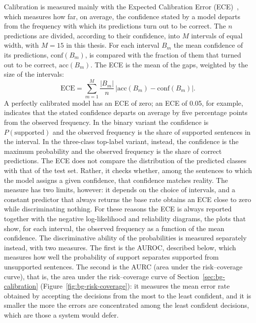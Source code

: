 Calibration is measured mainly with the Expected Calibration Error
(ECE)~\cite{naeini2015ece,guo2017calibration}, which measures how far, on average, the confidence stated by a model
departs from the frequency with which its predictions turn out to be correct. The $n$ predictions are divided, according
to their confidence, into $M$ intervals of equal width, with $M = 15$ in this thesis. For each interval $B_m$ the mean
confidence of its predictions, $\mathrm{conf}(B_m)$, is compared with the fraction of them that turned out to be
correct, $\mathrm{acc}(B_m)$. The ECE is the mean of the gaps, weighted by the size of the intervals:
\begin{equation}
  \mathrm{ECE} = \sum_{m=1}^{M} \frac{|B_m|}{n} \, \bigl| \mathrm{acc}(B_m) - \mathrm{conf}(B_m) \bigr| .
  \label{eq:ece}
\end{equation}
A perfectly calibrated model has an ECE of zero; an ECE of 0.05, for example, indicates that the stated confidence
departs on average by five percentage points from the observed frequency. In the binary variant the confidence is $P(\text{supported})$ and the
observed frequency is the share of supported sentences in the interval. In the three-class top-label variant, instead,
the confidence is the maximum probability and the observed frequency is the share of correct predictions. The ECE does
not compare the distribution of the predicted classes with that of the test set. Rather, it checks whether, among the
sentences to which the model assigns a given confidence, that confidence matches reality. The measure has two limits,
however: it depends on the choice of intervals, and a constant predictor that always returns the base rate obtains an
ECE close to zero while discriminating nothing. For these reasons the ECE is always reported together with the
negative log-likelihood and reliability diagrams, the plots that show, for each interval, the observed frequency as a
function of the mean confidence. The discriminative ability of the probabilities is measured separately instead, with
two measures. The first is the AUROC, described below, which measures how well the probability of support separates
supported from unsupported sentences. The second is the AURC (area under the
risk--coverage curve), that is, the area under the risk--coverage curve of Section~\ref{sec:bg-calibration}
(Figure~\ref{fig:bg-risk-coverage}): it measures the mean error rate obtained by accepting the decisions from the most
to the least confident, and it is smaller the more the errors are concentrated among the least confident decisions,
which are those a system would defer.

